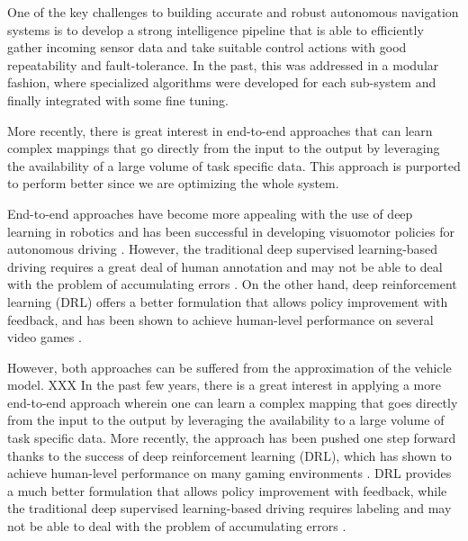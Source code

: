 \documentclass[../thesis.tex]{subfiles}
\begin{document}

One of the key challenges to building accurate and robust autonomous navigation systems is to develop a strong intelligence pipeline that is able to efficiently gather incoming sensor data and take suitable control actions with good repeatability and fault-tolerance. In the past, this was addressed in a modular fashion, where  specialized algorithms were developed for each sub-system and finally integrated with some fine tuning. 

More recently, there is great interest in end-to-end approaches that can learn complex mappings that go directly from the input to the output by leveraging the availability of a large volume of task specific data. This approach is purported to perform better since we are optimizing the whole system. 


End-to-end approaches have become more appealing with the use of deep learning in robotics and has been successful in developing visuomotor policies for autonomous driving \cite{deepdriving,nvidiacar,endtoendcars}. However, the traditional deep supervised learning-based driving requires a great deal of human annotation and may not be able to deal with the problem of accumulating errors \cite{ross2011reduction}. On the other hand, deep reinforcement learning (DRL) offers a better formulation that allows policy improvement with feedback, and has been shown to achieve human-level performance on several video games \cite{mnih2013playing, mnih2015human,2016-TOG-deepRL}.


However, both approaches can be suffered from the approximation of the vehicle model. XXX %
In the past few years, there is a great interest in applying a more end-to-end approach \cite{deepdriving,nvidiacar,endtoendcars} wherein one can learn a complex mapping that goes directly from the input to the output by leveraging the availability to a large volume of task specific data. More recently, the approach has been pushed one step forward thanks to the success of deep reinforcement learning (DRL), which has shown to achieve human-level performance on many gaming environments \cite{mnih2013playing, mnih2015human,2016-TOG-deepRL}. DRL provides a much better formulation that allows policy improvement with feedback, while the traditional deep supervised learning-based driving requires labeling and may not be able to deal with the problem of accumulating errors \cite{ross2011reduction}. 
\end{document}

